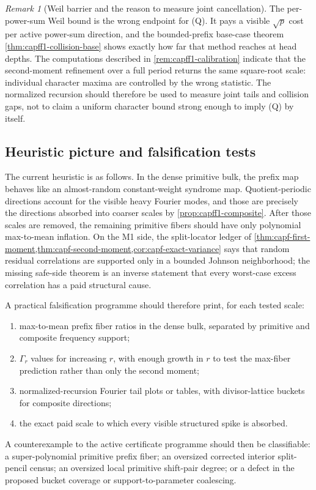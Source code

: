 \documentclass[11pt]{article}
\theoremstyle{definition}
\theoremstyle{remark}
\newtheorem{remark}[remark]{Remark}
\begin{document}
\begin{remark}[Weil barrier and the reason to measure joint cancellation]\label{rem:capfpr-weil-barrier}
The per-power-sum Weil bound is the wrong endpoint for \textup{(Q)}.  It pays a visible $\sqrt p$ cost per active power-sum direction, and the bounded-prefix base-case theorem \cref{thm:capff1-collision-base} shows exactly how far that method reaches at head depths.  The computations described in \cref{rem:capff1-calibration} indicate that the second-moment refinement over a full period returns the same square-root scale: individual character maxima are controlled by the wrong statistic.  The normalized recursion should therefore be used to measure joint tails and collision gaps, not to claim a uniform character bound strong enough to imply \textup{(Q)} by itself.
\end{remark}

\subsection{Heuristic picture and falsification tests}\label{subsec:capfpr-heuristics}

The current heuristic is as follows.  In the dense primitive bulk, the prefix map behaves like an almost-random constant-weight syndrome map.  Quotient-periodic directions account for the visible heavy Fourier modes, and those are precisely the directions absorbed into coarser scales by \cref{prop:capff1-composite}.  After those scales are removed, the remaining primitive fibers should have only polynomial max-to-mean inflation.  On the M1 side, the split-locator ledger of \cref{thm:capf-first-moment,thm:capf-second-moment,cor:capf-exact-variance} says that random residual correlations are supported only in a bounded Johnson neighborhood; the missing safe-side theorem is an inverse statement that every worst-case excess correlation has a paid structural cause.

A practical falsification programme should therefore print, for each tested scale:
\begin{enumerate}[label=\textup{(\roman*)},leftmargin=2.4em]
\item max-to-mean prefix fiber ratios in the dense bulk, separated by primitive and composite frequency support;
\item $\Gamma_r$ values for increasing $r$, with enough growth in $r$ to test the max-fiber prediction rather than only the second moment;
\item normalized-recursion Fourier tail plots or tables, with divisor-lattice buckets for composite directions;
\item the exact paid scale to which every visible structured spike is absorbed.
\end{enumerate}
A counterexample to the active certificate programme should then be classifiable: a super-polynomial primitive prefix fiber; an oversized corrected interior split-pencil census; an oversized local primitive shift-pair degree; or a defect in the proposed bucket coverage or support-to-parameter coalescing.
\end{document}
